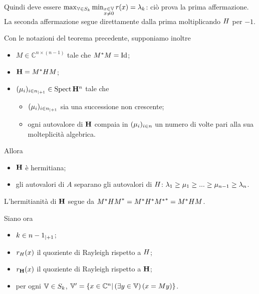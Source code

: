 \par Quindi deve essere $\max_{\mathbb{V} \in S_k} \min_{\substack{x \in \mathbb{V}\\x \neq 0}} r(x) = \lambda_k$: ci\`o prova la prima affermazione. La seconda affermazione segue direttamente dalla prima moltiplicando $H$ per $-1$. \EndProof
\begin{Corollary}
	Con le notazioni del teorema precedente, supponiamo inoltre
	\begin{itemize}
		\item $M \in \mathbb{C}^{n \times (n - 1)}$ tale che $\HermitianTransposed{M} M = \Identity$;
		\item $\mathbf{H} = {M}^*H M$;
		\item $(\mu_i)_{i \in {n}_{|+ 1}} \in \operatorname{Spect}{\mathbf{H}}^n$ tale che
		\begin{itemize}
			\item $(\mu_i)_{i \in {n}_{|+ 1}}$ sia una successione non crescente;
			\item ogni autovalore di $\mathbf{H}$ compaia in $(\mu_i)_{i \in n}$ un numero di volte pari alla sua molteplicit\`a algebrica.
		\end{itemize}
	\end{itemize}
	Allora
	\begin{itemize}
		\item $\mathbf{H}$ \`e hermitiana;
		\item gli autovalori di $A$ separano gli autovalori di $H$: $\lambda_1 \geq \mu_1 \geq ... \geq \mu_{n - 1} \geq \lambda_n$.
	\end{itemize}
\end{Corollary}
\Proof L'hermitianit\`a di $\mathbf{H}$ segue da ${{M}^* H M}^* = {M}^* {H}^* {{M}^*}^* = {M}^* H M$.
\par Siano ora
\begin{itemize}
	\item $k \in {n - 1}_{|+ 1}$;
	\item $r_H(x)$ il quoziente di Rayleigh rispetto a $H$;
	\item $r_{\mathbf{H}}(x)$ il quoziente di Rayleigh rispetto a $\mathbf{H}$;
	\item per ogni $\mathbb{V} \in S_k$, $\mathbb{V}' = \lbrace x \in \mathbb{C}^n | \left ( \exists y \in \mathbb{V} \right ) \left ( x = My \right ) \rbrace$.
\end{itemize}
